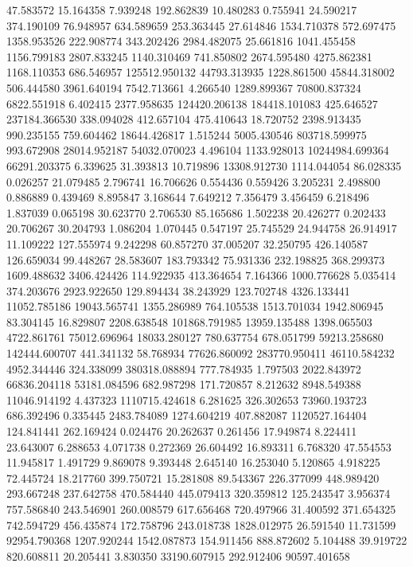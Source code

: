 47.583572
15.164358
7.939248
192.862839
10.480283
0.755941
24.590217
374.190109
76.948957
634.589659
253.363445
27.614846
1534.710378
572.697475
1358.953526
222.908774
343.202426
2984.482075
25.661816
1041.455458
1156.799183
2807.833245
1140.310469
741.850802
2674.595480
4275.862381
1168.110353
686.546957
125512.950132
44793.313935
1228.861500
45844.318002
506.444580
3961.640194
7542.713661
4.266540
1289.899367
70800.837324
6822.551918
6.402415
2377.958635
124420.206138
184418.101083
425.646527
237184.366530
338.094028
412.657104
475.410643
18.720752
2398.913435
990.235155
759.604462
18644.426817
1.515244
5005.430546
803718.599975
993.672908
28014.952187
54032.070023
4.496104
1133.928013
10244984.699364
66291.203375
6.339625
31.393813
10.719896
13308.912730
1114.044054
86.028335
0.026257
21.079485
2.796741
16.706626
0.554436
0.559426
3.205231
2.498800
0.886889
0.439469
8.895847
3.168644
7.649212
7.356479
3.456459
6.218496
1.837039
0.065198
30.623770
2.706530
85.165686
1.502238
20.426277
0.202433
20.706267
30.204793
1.086204
1.070445
0.547197
25.745529
24.944758
26.914917
11.109222
127.555974
9.242298
60.857270
37.005207
32.250795
426.140587
126.659034
99.448267
28.583607
183.793342
75.931336
232.198825
368.299373
1609.488632
3406.424426
114.922935
413.364654
7.164366
1000.776628
5.035414
374.203676
2923.922650
129.894434
38.243929
123.702748
4326.133441
11052.785186
19043.565741
1355.286989
764.105538
1513.701034
1942.806945
83.304145
16.829807
2208.638548
101868.791985
13959.135488
1398.065503
4722.861761
75012.696964
18033.280127
780.637754
678.051799
59213.258680
142444.600707
441.341132
58.768934
77626.860092
283770.950411
46110.584232
4952.344446
324.338099
380318.088894
777.784935
1.797503
2022.843972
66836.204118
53181.084596
682.987298
171.720857
8.212632
8948.549388
11046.914192
4.437323
1110715.424618
6.281625
326.302653
73960.193723
686.392496
0.335445
2483.784089
1274.604219
407.882087
1120527.164404
124.841441
262.169424
0.024476
20.262637
0.261456
17.949874
8.224411
23.643007
6.288653
4.071738
0.272369
26.604492
16.893311
6.768320
47.554553
11.945817
1.491729
9.869078
9.393448
2.645140
16.253040
5.120865
4.918225
72.445724
18.217760
399.750721
15.281808
89.543367
226.377099
448.989420
293.667248
237.642758
470.584440
445.079413
320.359812
125.243547
3.956374
757.586840
243.546901
260.008579
617.656468
720.497966
31.400592
371.654325
742.594729
456.435874
172.758796
243.018738
1828.012975
26.591540
11.731599
92954.790368
1207.920244
1542.087873
154.911456
888.872602
5.104488
39.919722
820.608811
20.205441
3.830350
33190.607915
292.912406
90597.401658
